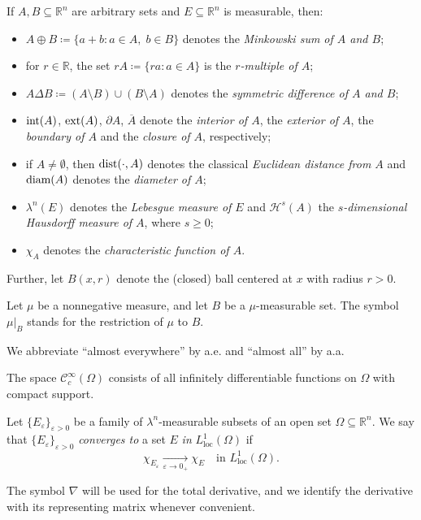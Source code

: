 \documentclass[pdflatex,sn-mathphys-num]{sn-jnl}
\theoremstyle{plain}
\theoremstyle{definition}
\DeclareMathOperator{\ext}{\textup{ext}}
\DeclareMathOperator{\inter}{\textup{int}}
\DeclareMathOperator{\dist}{\textup{dist}}
\DeclareMathOperator{\diam}{\textup{diam}}
\begin{document}
If $A, B\subseteq\mathbb{R}^n$ are arbitrary sets and $E\subseteq\mathbb{R}^n$ is measurable, then: \begin{itemize} 
\item $A\oplus B\coloneq \{a+b:a\in A,\; b\in B\}$ denotes the \textit{Minkowski sum of $A$ and $B$};
    \item for $r\in\mathbb{R}$, the set $rA\coloneq\{ra:a\in A\}$ is the \textit{$r$-multiple of $A$};
    \item $A\Delta B\coloneq (A\setminus B)\cup(B\setminus A)$ denotes the \textit{symmetric difference of $A$ and $B$}; 
    \item $\inter (A)$, $\ext (A)$, $\partial A$, $\overline{A}$ denote the \textit{interior of $A$}, the \textit{exterior of $A$}, the \textit{boundary of $A$} and the \textit{closure of $A$}, respectively;
    \item if $A\neq\emptyset$, then $\dist(\cdot, A)$ denotes the classical \textit{Euclidean distance from $A$} and $\diam(A)$ denotes the \textit{diameter of $A$};
    \item $\lambda^n(E)$ denotes the \textit{Lebesgue measure of $E$} and $\mathcal{H}^s(A)$ the \textit{$s$-dimensional Hausdorff measure of $A$}, where $s\geq0$;
    \item $\chi_A$ denotes the \textit{characteristic function of $A$}.
\end{itemize} 



Further, let $B(x,r)$ denote the (closed) ball centered at $x$ with radius $r>0$. 

Let $\mu$ be a nonnegative measure, and let $B$ be a $\mu$-measurable set.  
The symbol $\mu\Big|_B$ stands for the restriction of $\mu$ to $B$.

We abbreviate “almost everywhere” by a.e. and “almost all” by a.a.  

The space $\mathcal{C}_c^{\infty}(\Omega)$ consists of all infinitely differentiable functions on $\Omega$ with compact support.  

Let $\{E_\varepsilon\}_{\varepsilon>0}$ be a family of $\lambda^n$-measurable subsets of an open set $\Omega\subseteq\mathbb{R}^n$.  
We say that $\{E_\varepsilon\}_{\varepsilon>0}$ \emph{converges to} a set $E$ \emph{in} $L^1_{\mathrm{loc}}(\Omega)$ if  
\[
\chi_{E_\varepsilon} \xrightarrow[\varepsilon\to0_+]{} \chi_E 
\quad\text{in } L^1_{\mathrm{loc}}(\Omega).
\]

The symbol $\nabla$ will be used for the total derivative, and we identify the derivative with its representing matrix whenever convenient.
\end{document}
